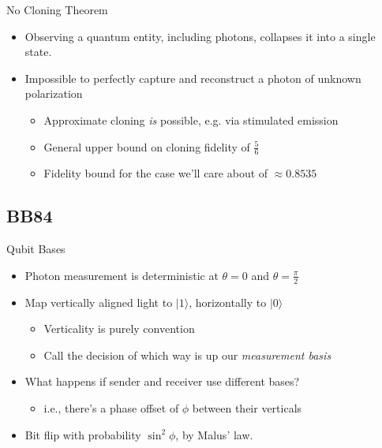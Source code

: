 \documentclass[pdf]{beamer}
\begin{document}
\begin{frame}{No Cloning Theorem}
  \begin{itemize}
  \item Observing a quantum entity, including photons, collapses it into a
    single state.
  \pause\item Impossible to perfectly capture and reconstruct a photon of
    unknown polarization
    \begin{itemize}
    \item Approximate cloning \emph{is} possible, e.g. via stimulated emission
    \item General upper bound on cloning fidelity of $\frac{5}{6}$
    \item Fidelity bound for the case we'll care about of $\approx 0.8535$
    \end{itemize}
  \end{itemize}
\end{frame}

\subsection{BB84}
\begin{frame}{Qubit Bases}
  \begin{itemize}
  \item Photon measurement is deterministic at $\theta=0$ and $\theta=\frac{\pi}{2}$
  \pause\item Map vertically aligned light to $|1\rangle$, horizontally to $|0\rangle$
    \begin{itemize}
    \item Verticality is purely convention
    \item Call the decision of which way is up our \emph{measurement basis}
    \end{itemize}
  \pause\item What happens if sender and receiver use different bases?
    \begin{itemize}
    \item i.e., there's a phase offset of $\phi$ between their verticals
    \end{itemize}
  \pause\item Bit flip with probability $\sin^2 \phi$, by Malus' law.
  \end{itemize}
\end{frame}
\end{document}

